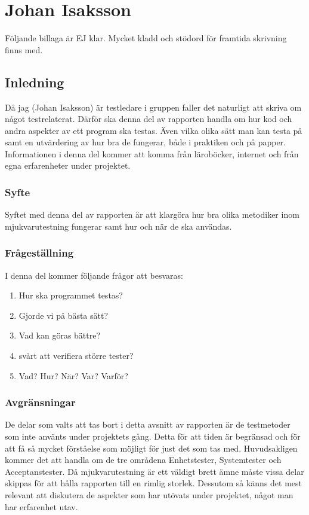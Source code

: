 \section{Johan Isaksson}
	Följande billaga är EJ klar. Mycket kladd och stödord för framtida skrivning finns med.
	\subsection{Inledning}
	Då jag (Johan Isaksson) är testledare i gruppen faller det naturligt att skriva om något testrelaterat. Därför ska denna del av rapporten handla om hur kod och andra aspekter av ett program ska testas. Även vilka olika sätt man kan testa på samt en utvärdering av hur bra de fungerar, både i praktiken och på papper. Informationen i denna del kommer att komma från läroböcker, internet och från egna erfarenheter under projektet. 
	
	
	\subsubsection{Syfte}
	Syftet med denna del av rapporten är att klargöra hur bra olika metodiker inom mjukvarutestning fungerar samt hur och när de ska användas. 
	
	
	\subsubsection{Frågeställning}
	I denna del kommer följande frågor att besvaras:
	\begin{enumerate}
	\item{Hur ska programmet testas?}
	\item{Gjorde vi på bästa sätt?}
	\item{Vad kan göras bättre?}
	\item{svårt att verifiera större tester?}
	\item{Vad? Hur? När? Var? Varför?}	
	\end{enumerate}
	
	\subsubsection{Avgränsningar}
	De delar som valts att tas bort i detta avsnitt av rapporten är de testmetoder som inte använts under projektets gång. Detta för att tiden är begränsad och för att få så mycket förståelse som möjligt för just det som tas med. Huvudsakligen kommer det att handla om de tre områdena Enhetstester, Systemtester och Acceptanstester. \newline
	Då mjukvarutestning är ett väldigt brett ämne måste vissa delar skippas för att hålla rapporten till en rimlig storlek. Dessutom så känns det mest relevant att diskutera de aspekter som har utövats under projektet, något man har erfarenhet utav.
	
